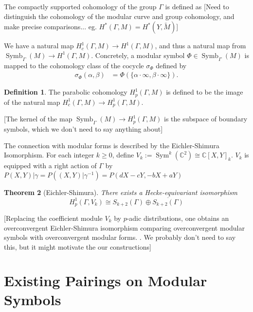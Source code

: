 \documentclass[10pt]{amsart}
\theoremstyle{plain}
\newtheorem{theorem}{Theorem}[section]
\theoremstyle{definition}
\newtheorem{definition}[theorem]{Definition}
\newcommand{\CC}{{\mathbb{C}}}
\newcommand{\cH}{\mathcal{H}}
\DeclareMathOperator{\Sym}{Sym}
\DeclareMathOperator{\Symb}{Symb}
\begin{document}
The compactly supported cohomology of the group $\Gamma$ is defined as 
[Need to distinguish the cohomology of the modular curve and group cohomology, and make precise comparisons... eg. $H^*(\Gamma, M) = H^*(Y, \widetilde{M})$]



We have a natural map $H^1_c(\Gamma, M)\longrightarrow H^1(\Gamma,M)$, and thus a natural map from $\Symb_\Gamma(M)\longrightarrow H^1(\Gamma,M)$. Concretely, a modular symbol $\Phi\in \Symb_\Gamma(M)$ is mapped to the cohomology class of the cocycle $\sigma_\Phi$ defined by
\begin{align*}
\sigma_{\Phi}(\alpha, \beta) &= \Phi(\{\alpha \cdot \infty, \beta \cdot \infty\}).%
\end{align*}
\begin{definition}
The parabolic cohomology $H^1_p(\Gamma,M)$ is defined to be the image of the natural map $H^1_c(\Gamma,M)\longrightarrow H^1_p(\Gamma,M)$.
\end{definition}
[The kernel of the map $\Symb_\Gamma(M)\longrightarrow H^1_p(\Gamma,M)$ is the subspace of boundary symbols, which we don't need to say anything about]

The connection with modular forms is described by the Eichler-Shimura Isomorphism. For each integer $k\geq 0$, define $V_k:=\Sym^k(\CC^2)\cong \CC[X,Y]_k$. $V_k$ is equipped with a right action of $\Gamma$ by $P(X,Y)|\gamma =P((X,Y)|\gamma^{-1})=P(dX-cY,-bX+aY)$ %
\begin{theorem}[Eichler-Shimura]
There exists a Hecke-equivariant isomorphism
\begin{equation*}
	H^1_p(\Gamma, V_k) \cong S_{k+2}(\Gamma)\oplus \overline{S_{k+2}(\Gamma)}
\end{equation*}
\end{theorem}

[Replacing the coefficient module $V_k$ by $p$-adic distributions, one obtains an overconvergent Eichler-Shimura isomorphism comparing overconvergent modular symbols with overconvergent modular forms. \cite{Andreatta, Iovita, Stevens}. We probably don't need to say this, but it might motivate the our constructions]

\section{Existing Pairings on Modular Symbols} \label{sec:existing_pairings}
\end{document}

